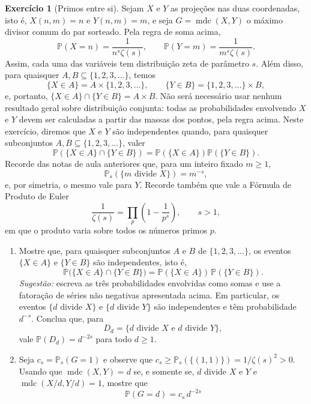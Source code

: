 \documentclass[12pt,portuguese]{article}
\theoremstyle{definition}
\newtheorem{exercise}{Exercício}
\newcommand{\mdc}{\operatorname{mdc}}
\begin{document}
\begin{exercise}[Primos entre si]
Sejam \(X\) e \(Y\) as projeções nas duas coordenadas, isto é,
\(X(n,m)=n\) e \(Y(n,m)=m\), e seja \(G=\mdc(X,Y)\) o máximo divisor
comum do par sorteado. Pela regra de soma acima,
\[
\mathbb{P}(X=n)=\frac{1}{n^s\zeta(s)},
\qquad
\mathbb{P}(Y=m)=\frac{1}{m^s\zeta(s)}.
\]
Assim, cada uma das variáveis tem distribuição zeta de parâmetro \(s\).
Além disso, para quaisquer \(A,B\subseteq\{1,2,3,\ldots\}\), temos
\[
\{X\in A\}=A\times\{1,2,3,\ldots\},\qquad
\{Y\in B\}=\{1,2,3,\ldots\}\times B,
\]
e, portanto, \(\{X\in A\}\cap\{Y\in B\}=A\times B\).
Não será necessário usar nenhum resultado geral sobre distribuição conjunta:
todas as probabilidades envolvendo \(X\) e \(Y\) devem ser calculadas a
partir das massas dos pontos, pela regra acima. Neste exercício, diremos que
\(X\) e \(Y\) são independentes quando, para quaisquer subconjuntos
\(A,B\subseteq\{1,2,3,\ldots\}\), valer
\[
\mathbb{P}(\{X\in A\}\cap\{Y\in B\})
=\mathbb{P}(\{X\in A\})\mathbb{P}(\{Y\in B\}).
\]
Recorde das notas de aula anteriores que, para um inteiro fixado
\(m\geqslant1\),
\[
\mathbb{P}_s(\{m\text{ divide }X\})=m^{-s},
\]
e, por simetria, o mesmo vale para \(Y\). Recorde também que vale a Fórmula de Produto
de Euler
\[
\frac{1}{\zeta(s)} = \prod_{p} \left(1 - \frac{1}{p^{s}}\right),
\qquad s > 1,
\]
em que o produto varia sobre todos os números primos \(p\).
\begin{enumerate}[label=(\alph*)]
  \item Mostre que, para quaisquer subconjuntos \(A\) e \(B\) de
        \(\{1, 2, 3, \ldots\}\), os eventos \(\{X \in A\}\) e
        \(\{Y \in B\}\) são independentes, isto é,
        \[
        \mathbb{P}\bigl(\{X \in A\} \cap \{Y \in B\}\bigr)
        = \mathbb{P}(\{X \in A\})\,\mathbb{P}(\{Y \in B\}).
        \]
        \emph{Sugestão:} escreva as três probabilidades envolvidas como
        somas e use a fatoração de séries não negativas apresentada acima.
        Em particular, os eventos
        \(\{d \text{ divide } X\}\) e \(\{d \text{ divide } Y\}\) são
        independentes e têm probabilidade \(d^{-s}\). Conclua que, para
        \[
        D_d=\{d\text{ divide }X\text{ e }d\text{ divide }Y\},
        \]
        vale \(\mathbb{P}(D_d)=d^{-2s}\) para todo \(d\geqslant1\).
  \item Seja \(c_s = \mathbb{P}_s(G = 1)\) e observe que
        \(c_s \geqslant \mathbb{P}_s(\{(1, 1)\}) = 1/\zeta(s)^2 > 0\). Usando
        que \(\mdc(X, Y) = d\) se, e somente se, \(d\) divide \(X\) e
        \(Y\) e \(\mdc(X/d, Y/d) = 1\), mostre que
        \[
        \mathbb{P}(G = d) = c_s\,d^{-2s}
\]
\end{enumerate}
\end{exercise}
\end{document}
